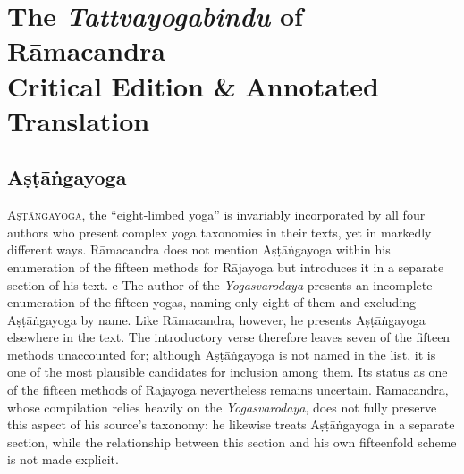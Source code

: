 %

\mainmatter
\pagestyle{defaultstyle}
\renewcommand{\thetable}{\arabic{table}}
\newpage


\chapter[Critical Edition \& Annotated Translation of the \emph{Tattvayogabindu}]{The \emph{Tattvayogabindu} of Rāmacandra \\ \huge  
  Critical Edition \& Annotated Translation}
\pagestyle{chapter2style}
\newpage
\begin{criticaledition}

\end{criticaledition}

\section{Aṣṭāṅgayoga}
\label{ashtangayogacomplex}

\lettrine{A}{ṣṭāṅgayoga}, the ``eight-limbed yoga'' is invariably incorporated by all four authors who present complex yoga taxonomies in their texts, yet in markedly different ways. Rāmacandra does not mention Aṣṭāṅgayoga within his enumeration of the fifteen methods for Rājayoga but introduces it in a separate section of his text.
e
The author of the \textit{Yogasvarodaya} presents an incomplete enumeration of the fifteen yogas, naming only eight of them and excluding Aṣṭāṅgayoga by name. Like Rāmacandra, however, he presents Aṣṭāṅgayoga elsewhere in the text. The introductory verse therefore leaves seven of the fifteen methods unaccounted for; although Aṣṭāṅgayoga is not named in the list, it is one of the most plausible candidates for inclusion among them. Its status as one of the fifteen methods of Rājayoga nevertheless remains uncertain. Rāmacandra, whose compilation relies heavily on the \textit{Yogasvarodaya}, does not fully preserve this aspect of his source's taxonomy: he likewise treats Aṣṭāṅgayoga in a separate section, while the relationship between this section and his own fifteenfold scheme is not made explicit.

